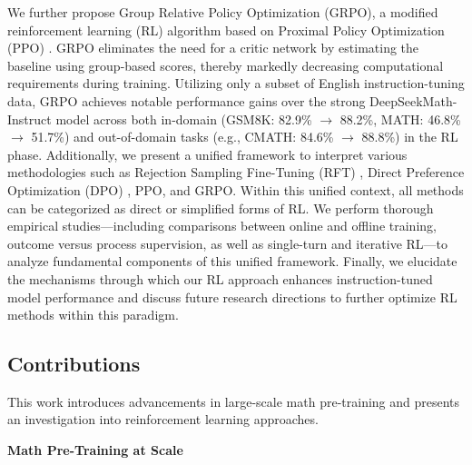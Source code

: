 We further propose Group Relative Policy Optimization (GRPO), a modified reinforcement learning (RL) algorithm based on Proximal Policy Optimization (PPO) \citep{schulman2017proximal}. GRPO eliminates the need for a critic network by estimating the baseline using group-based scores, thereby markedly decreasing computational requirements during training. Utilizing only a subset of English instruction-tuning data, GRPO achieves notable performance gains over the strong DeepSeekMath-Instruct model across both in-domain (GSM8K: 82.9\% $\rightarrow$ 88.2\%, MATH: 46.8\% $\rightarrow$ 51.7\%) and out-of-domain tasks (e.g., CMATH: 84.6\% $\rightarrow$ 88.8\%) in the RL phase. Additionally, we present a unified framework to interpret various methodologies such as Rejection Sampling Fine-Tuning (RFT) \citep{yuan2023scaling}, Direct Preference Optimization (DPO) \citep{dpo}, PPO, and GRPO. Within this unified context, all methods can be categorized as direct or simplified forms of RL. We perform thorough empirical studies—including comparisons between online and offline training, outcome versus process supervision, as well as single-turn and iterative RL—to analyze fundamental components of this unified framework. Finally, we elucidate the mechanisms through which our RL approach enhances instruction-tuned model performance and discuss future research directions to further optimize RL methods within this paradigm.

\subsection{Contributions}
This work introduces advancements in large-scale math pre-training and presents an investigation into reinforcement learning approaches.

\textbf{Math Pre-Training at Scale}

